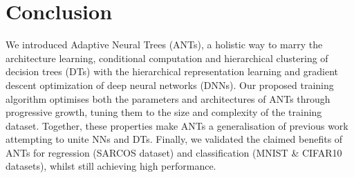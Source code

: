 
\section{Conclusion}
\vspace{-2mm}
We introduced Adaptive Neural Trees (ANTs), a holistic way to marry the architecture learning, conditional computation and hierarchical clustering of decision trees (DTs) with the hierarchical representation learning and gradient descent optimization of deep neural networks (DNNs). %
Our proposed training algorithm optimises both the parameters and architectures of ANTs through progressive growth, tuning them to the size and complexity of the training dataset. Together, these properties make ANTs a generalisation of previous work attempting to unite NNs and DTs. Finally, we validated the claimed benefits of ANTs for regression (SARCOS dataset) and classification (MNIST \& CIFAR10 datasets), whilst still achieving high performance. 





